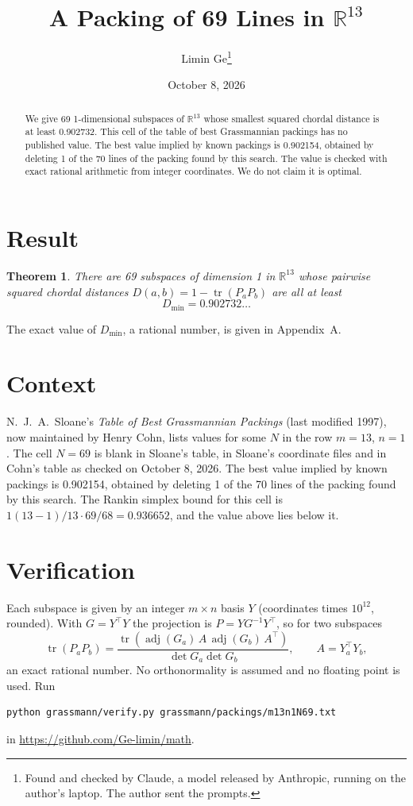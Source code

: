 \documentclass[11pt,a4paper]{article}
\title{A Packing of 69 Lines in $\mathbb{R}^{13}$}
\author{Limin Ge\thanks{Found and checked by Claude, a model released by Anthropic, running on the author's laptop. The author sent the prompts.}}
\date{October 8, 2026}
\newtheorem*{theorem}{Theorem}
\begin{document}
\maketitle
\begin{abstract}
We give 69 1-dimensional subspaces of $\mathbb{R}^{13}$ whose smallest squared chordal distance is at least 0.902732. This cell of the table of best Grassmannian packings has no published value. The best value implied by known packings is 0.902154, obtained by deleting 1 of the 70 lines of the packing found by this search. The value is checked with exact rational arithmetic from integer coordinates. We do not claim it is optimal.
\end{abstract}

\section{Result}
\begin{theorem}
There are 69 subspaces of dimension 1 in $\mathbb{R}^{13}$ whose pairwise squared chordal distances $D(a,b) = 1 - \operatorname{tr}(P_aP_b)$ are all at least
\[ D_{\min} = 0.902732\ldots \]
\end{theorem}
The exact value of $D_{\min}$, a rational number, is given in Appendix~A.


\section{Context}
N.~J.~A.~Sloane's \emph{Table of Best Grassmannian Packings} (last modified 1997), now maintained by Henry Cohn, lists values for some $N$ in the row $m=13$, $n=1$. The cell $N=69$ is blank in Sloane's table, in Sloane's coordinate files and in Cohn's table as checked on October 8, 2026. The best value implied by known packings is 0.902154, obtained by deleting 1 of the 70 lines of the packing found by this search. The Rankin simplex bound for this cell is $1(13-1)/13\cdot 69/68 = 0.936652$, and the value above lies below it.


\section{Verification}
Each subspace is given by an integer $m\times n$ basis $Y$ (coordinates times $10^{12}$, rounded). With $G=Y^\top Y$ the projection is $P=YG^{-1}Y^\top$, so for two subspaces
\[ \operatorname{tr}(P_aP_b)=\frac{\operatorname{tr}(\operatorname{adj}(G_a)\,A\,\operatorname{adj}(G_b)\,A^\top)}{\det G_a\det G_b},\qquad A=Y_a^\top Y_b, \]
an exact rational number. No orthonormality is assumed and no floating point is used. Run
\begin{verbatim}
python grassmann/verify.py grassmann/packings/m13n1N69.txt
\end{verbatim}
in \url{https://github.com/Ge-limin/math}.
\end{document}
